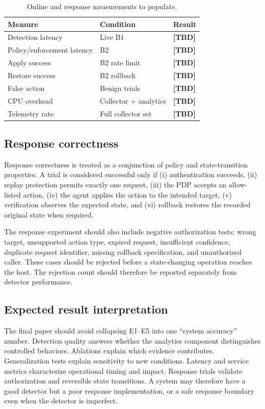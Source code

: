 \documentclass[sigconf,review]{acmart}
\newcommand{\TBD}{\textbf{[TBD]}}
\newcommand{\DetLat}{\TBD}
\newcommand{\RespLat}{\TBD}
\newcommand{\ApplyRate}{\TBD}
\newcommand{\RestoreRate}{\TBD}
\newcommand{\FalseAction}{\TBD}
\newcommand{\CPUOverhead}{\TBD}
\newcommand{\TelemetryOverhead}{\TBD}
\begin{document}
\begin{table}[t]
\caption{Online and response measurements to populate.}
\label{tab:online}
\centering\scriptsize
\setlength{\tabcolsep}{3pt}
\renewcommand{\arraystretch}{1.08}
\begin{tabular}{lll}
\toprule
Measure & Condition & Result \\
\midrule
Detection latency & Live B1 & \DetLat \\
Policy/enforcement latency & B2 & \RespLat \\
Apply success & B2 rate limit & \ApplyRate \\
Restore success & B2 rollback & \RestoreRate \\
False action & Benign trials & \FalseAction \\
CPU overhead & Collector + analytics & \CPUOverhead \\
Telemetry rate & Full collector set & \TelemetryOverhead \\
\bottomrule
\end{tabular}
\end{table}

\subsection{Response correctness}
Response correctness is treated as a conjunction of policy and state-transition properties. A trial is considered successful only if (i) authentication succeeds, (ii) replay protection permits exactly one request, (iii) the PDP accepts an allow-listed action, (iv) the agent applies the action to the intended target, (v) verification observes the expected state, and (vi) rollback restores the recorded original state when required.

The response experiment should also include negative authorization tests: wrong target, unsupported action type, expired request, insufficient confidence, duplicate request identifier, missing rollback specification, and unauthorized caller. These cases should be rejected before a state-changing operation reaches the host. The rejection count should therefore be reported separately from detector performance.

\subsection{Expected result interpretation}
The final paper should avoid collapsing E1--E5 into one ``system accuracy'' number. Detection quality answers whether the analytics component distinguishes controlled behaviors. Ablations explain which evidence contributes. Generalization tests explain sensitivity to new conditions. Latency and service metrics characterize operational timing and impact. Response trials validate authorization and reversible state transitions. A system may therefore have a good detector but a poor response implementation, or a safe response boundary even when the detector is imperfect.
\end{document}
